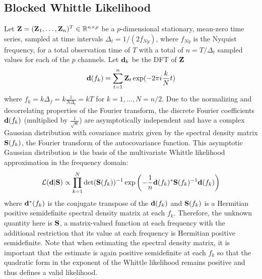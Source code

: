 \documentclass[%
 reprint,
 amsmath,amssymb,
 aps,
]{revtex4-2}
\begin{document}
\subsection{Blocked Whittle Likelihood}

Let $\Z=(\Z_1,\ldots,\Z_n)^T\in  \mathbb{R}^{n\times p}$ be a $p$-dimensional stationary, mean-zero time series, sampled at time intervals $\Delta_t=1/(2f_{Ny})$, where $f_{Ny}$ is the Nyquist frequency, for a total observation time of $T$ with a total of $n=T/\Delta_t$ sampled values for each of the $p$ channels. Let $\d_k$ be the \ac{DFT} of $\Z$ 
\begin{align*}
\d(f_k) = \sum_{t=1}^{n} \Z_t\exp(-2\pi i \frac{k}{N} t)
\end{align*}
 where $f_k= k \Delta_f= k \frac{1}{N\Delta_t}=k T$ for $k=1,\ldots, N=n/2$.
Due to the normalizing and decorrelating properties of the Fourier transform, the discrete Fourier coefficients $\d(f_k)$ (multiplied by $\frac{1}{\sqrt{n}}$) are asymptotically independent and have a complex Gaussian distribution with covariance matrix given by the spectral density matrix $\S(f_k)$,  the Fourier transform of the autocovariance function. This asymptotic Gaussian distribution is the basis of the multivariate Whittle likelihood approximation in the frequency domain:
\begin{equation}\label{eq:Whittle likelihood}
 \mathcal{L}(\d|\S) \propto \prod_{k=1}^{N} \det(\S(f_k))^{-1} \exp\left(-\frac{1}{n}\d(f_k)^* \S(f_k)^{-1} \d(f_k)\right)
\end{equation}
where $\d^*(f_k)$ is the conjugate transpose of the $\d(f_k)$ and
 $\S(f_k)$ is a Hermitian positive semidefinite spectral density matrix at each $f_k$. Therefore, the unknown quantity here is $\S$, a matrix-valued function at each frequency with the additional restriction that its value at each frequency is Hermitian positive semidefinite. Note that when estimating the spectral density matrix, it is important that the estimate is again positive semidefinite at each $f_k$ so that the quadratic form in the exponent of the Whittle likelihood remains positive and thus defines a valid likelihood.
\end{document}
